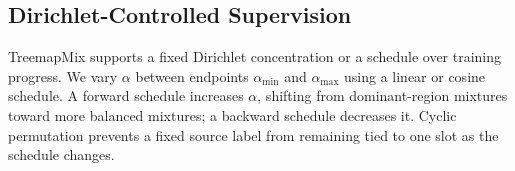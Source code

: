 \subsection{Dirichlet-Controlled Supervision}
\label{sec:gradient-supervision}

TreemapMix supports a fixed Dirichlet concentration or a schedule over training progress. We vary $\alpha$ between endpoints $\alpha_{\min}$ and $\alpha_{\max}$ using a linear or cosine schedule. A forward schedule increases $\alpha$, shifting from dominant-region mixtures toward more balanced mixtures; a backward schedule decreases it. Cyclic permutation prevents a fixed source label from remaining tied to one slot as the schedule changes.
